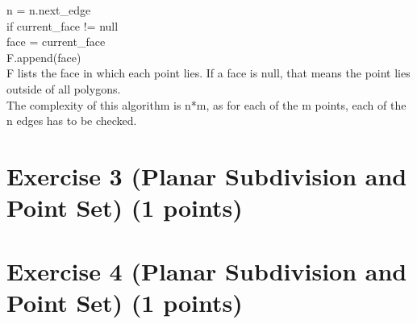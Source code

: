 \documentclass[english, fontsize=12pt, paper=a4, twoside=false, draft=true, pagesize=auto, version=last, DIV=16]{scrartcl}
\theoremstyle{break}
\begin{document}
\hspace*{10mm}\hspace*{10mm}\hspace*{10mm}n = n.next\_edge\\
\hspace*{10mm}\hspace*{10mm}if current\_face != null\\
\hspace*{10mm}\hspace*{10mm}\hspace*{10mm}face = current\_face\\
\hspace*{10mm}F.append(face)\\

F lists the face in which each point lies. If a face is null, that means the point lies outside of all polygons.\\
The complexity of this algorithm is n*m, as for each of the m points, each of the n edges has to be checked.

\newpage

\section*{Exercise 3 (Planar Subdivision and Point Set) {\large \hfill (1 points)}}

\section*{Exercise 4 (Planar Subdivision and Point Set) {\large \hfill (1 points)}}

\newpage
\end{document}
